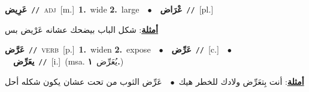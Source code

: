 \documentclass[10pt,a4paper,twoside]{article} %
\begin{document}
\begin{multicols}{2}
{\setlength\topsep{0pt}\textbf{\foreignlanguage{arabic}{عَرِيض}}\ {\color{gray}\texttt{//}\color{black}}\ \textsc{adj}\ [m.]\ \textbf{1.}~wide  \textbf{2.}~large\ \ $\bullet$\ \ \setlength\topsep{0pt}\textbf{\foreignlanguage{arabic}{عْرَاض}}\ {\color{gray}\texttt{//}\color{black}}\ [pl.]\  \begin{flushright}\color{gray}\foreignlanguage{arabic}{\textbf{\underline{\foreignlanguage{arabic}{أمثلة}}}: شكل الباب بيضحك عشانه عَرْيض بس}\end{flushright}\color{black}} \vspace{2mm}

{\setlength\topsep{0pt}\textbf{\foreignlanguage{arabic}{عَرَّض}}\ {\color{gray}\texttt{//}\color{black}}\ \textsc{verb}\ [p.]\ \textbf{1.}~widen  \textbf{2.}~expose\ \ $\bullet$\ \ \setlength\topsep{0pt}\textbf{\foreignlanguage{arabic}{عَرِّض}}\ {\color{gray}\texttt{//}\color{black}}\ [c.]\ \ $\bullet$\ \ \setlength\topsep{0pt}\textbf{\foreignlanguage{arabic}{يعَرِّض}}\ {\color{gray}\texttt{//}\color{black}}\ [i.]\ \color{gray}(msa. \foreignlanguage{arabic}{يُعَرِّض}~\foreignlanguage{arabic}{\textbf{١.}})\color{black}\  \begin{flushright}\color{gray}\foreignlanguage{arabic}{\textbf{\underline{\foreignlanguage{arabic}{أمثلة}}}: أنت بِتعَرِّض ولادك للخطر هيك\ $\bullet$\ \  عَرِّض الثوب من تحت عشان يكون شكله أحل}\end{flushright}\color{black}} \vspace{2mm}


\end{multicols}
\end{document}
